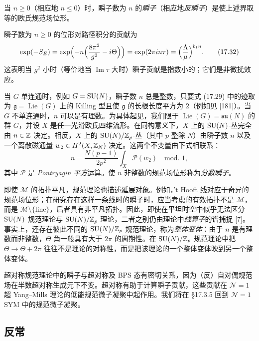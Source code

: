 \begin{definition}[17.30]
当 $n\ge0$（相应地 $n\le0$）时，瞬子数为 $n$ 的\emph{瞬子}（相应地\emph{反瞬子}）是使上述界取等的欧氏规范场位形。
\end{definition}

瞬子数为 $n\ge0$ 的位形对路径积分的贡献为
\begin{equation}
\exp(-S_E)=\exp\Bigl(-n\Bigl(\frac{8\pi^2}{g^2}-i\Theta\Bigr)\Bigr)=\exp(2\pi in\tau)=\Bigl(\frac{\Lambda}{\mu}\Bigr)^{b_1n}.
\tag{17.32}
\end{equation}
这表明当 $g^2$ 小时（等价地当 $\operatorname{Im}\tau$ 大时）瞬子贡献是指数小的；它们是非微扰效应。

\begin{remark}[17.31]
当 $G$ 单连通时，例如 $G=\operatorname{SU}(N)$，瞬子数 $n$ 总是整数，只要式 (17.29) 中的迹取为 $\mathfrak g=\operatorname{Lie}(G)$ 上的 Killing 型且使 $\mathfrak g$ 的长根长度平方为 $2$（例如见 [181]）。当 $G$ 不单连通时，$n$ 可以是有理数。为具体起见，我们限于 $\operatorname{Lie}(G)=\mathfrak{su}(N)$ 的群 $G$，并设 $X$ 是任一光滑欧氏四维流形。在同构意义下，$X$ 上的 $\operatorname{SU}(N)$-丛完全由 $n\in\mathbb{Z}$ 决定。相反，$X$ 上的 $\operatorname{SU}(N)/\mathbb{Z}_p$-丛（其中 $p$ 整除 $N$）由瞬子数 $n$ 以及一个离散磁通量 $w_2\in H^2(X,\mathbb{Z}_N)$ 决定。这两个不变量由下式相联系：
\[
n=\frac{N(p-1)}{2p^2}\int_X\mathcal{P}(w_2)\quad\text{mod. }1,
\]
其中 $\mathcal{P}$ 是 \emph{Pontryagin 平方}运算。使 $n$ 非整数的规范场位形称为\emph{分数瞬子}。
\end{remark}

即使 $\mathcal{M}$ 的拓扑平凡，规范理论也描述延展对象。例如，'t Hooft 线对应于奇异的规范场位形；在研究存在这样一条线时的瞬子时，应当考虑的有效拓扑不是 $\mathcal{M}$，而是 $\mathcal{M}\setminus\{\text{line}\}$，后者具有非平凡拓扑。因此，即使在平坦时空中似乎无法区分 $\operatorname{SU}(N)$ 规范理论与 $\operatorname{SU}(N)/\mathbb{Z}_p$ 理论，二者之别仍由理论中\emph{线算子}的谱捕捉 [7]。事实上，还存在彼此不同的 $\operatorname{SU}(N)/\mathbb{Z}_p$ 规范理论，称为\emph{整体变体}：由于 $n$ 是有理数而非整数，$\Theta$ 角一般具有大于 $2\pi$ 的周期性。在 $\operatorname{SU}(N)/\mathbb{Z}_p$ 规范理论中把 $\Theta\to\Theta+2\pi$ 往往不是理论的对称性，而是把该理论的一个整体变体映到另一个整体变体。

超对称规范理论中的瞬子与超对称及 BPS 态有密切关系，因为（反）自对偶规范场在半数超对称生成元下不变。超对称有助于计算瞬子贡献，这些贡献在 $\mathcal{N}=1$ 超 Yang--Mills 理论的低能规范微子凝聚中起作用。我们将在 §17.3.5 回到 $\mathcal{N}=1$ SYM 中的规范微子凝聚。

\subsection{反常}

